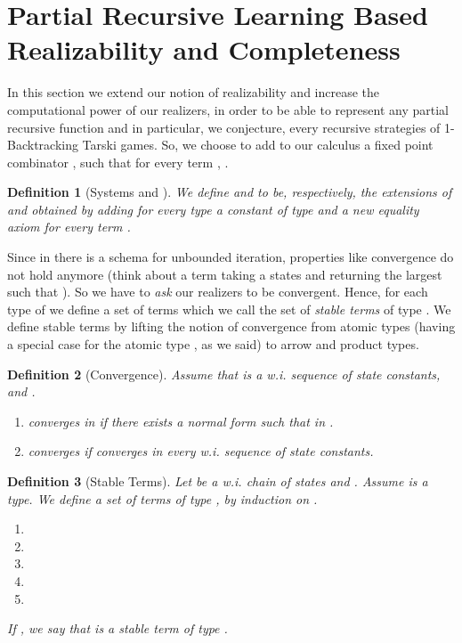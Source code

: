 \documentclass[copyright,creativecommons]{eptcs}
\newtheorem{definition}{Definition}
\begin{document}
\section{Partial Recursive Learning Based Realizability and Completeness}\label{completeness}

In this section we extend our notion of realizability and increase the computational power of our realizers, in order to be able to represent any partial recursive function and in particular, we conjecture, every recursive strategies of 1-Backtracking Tarski games. So, we choose to add to our calculus a fixed point combinator , such that for every term , . 

\begin{definition}[Systems  and  ]
We define  and  to be, respectively, the extensions of  and  obtained by adding for every type  a constant  of type  and a new equality axiom  for every term .

\end{definition}

Since in  there is a schema for unbounded iteration, properties like convergence do not hold anymore (think about a term taking a states  and returning the largest  such that  ). So we have to {\em ask} our realizers to be convergent. Hence, for each type  of  we define a set   of
terms  which we call the set of {\em stable terms} of
type . We define stable terms by lifting the notion of
convergence from atomic types (having a special case for the atomic
type , as we said) to arrow and product types.


\begin{definition}[Convergence]
\label{definition-Convergence2} Assume
that  is a w.i. sequence of state constants,
and .
\begin{enumerate}

\item
   converges in  if there exists a normal form  such that  in .

\item
 converges if  converges in every w.i. sequence of state constants.
\end{enumerate}
\end{definition}

\begin{definition}[Stable Terms]
\label{definition-StableTerms} Let
 be a w.i. chain of states and . Assume  is a
type. We define a set  of terms
 of type , by induction on .
\begin{enumerate}

\item


\item


\item


\item


\item

\end{enumerate}

If , we say that  is a {\em stable} term of type
.
\end{definition}
\end{document}
